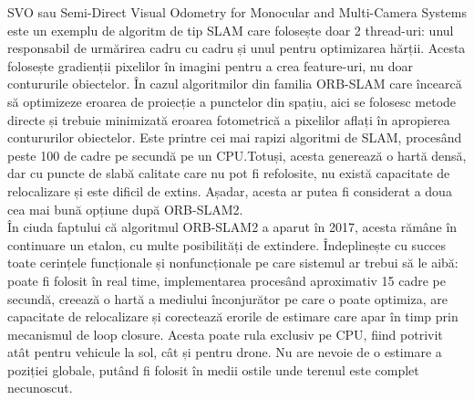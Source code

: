 \documentclass[12pt,a4paper]{report}
\begin{document}
SVO sau Semi-Direct Visual Odometry for Monocular and Multi-Camera Systems este un exemplu 
de algoritm de tip SLAM care folosește doar 2 thread-uri: unul responsabil de 
urmărirea cadru cu cadru și unul pentru optimizarea hărții. Acesta folosește gradienții
pixelilor în imagini pentru a crea feature-uri, nu doar contururile obiectelor. În cazul
algoritmilor din familia ORB-SLAM care încearcă să optimizeze eroarea de proiecție a punctelor
din spațiu, aici se folosesc metode directe și trebuie minimizată eroarea fotometrică a 
pixelilor aflați în apropierea contururilor obiectelor. Este printre cei mai rapizi algoritmi
de SLAM, procesând peste 100 de cadre pe secundă pe un CPU.\@ Totuși, acesta generează o hartă densă, dar cu 
puncte de slabă calitate care nu pot fi refolosite, nu există capacitate de relocalizare și 
este dificil de extins. Așadar, acesta ar putea fi considerat a doua cea mai bună opțiune după ORB-SLAM2.\\

În ciuda faptului că algoritmul ORB-SLAM2 a aparut în 2017, acesta rămâne în continuare 
un etalon, cu multe posibilități de extindere. Îndeplinește cu succes toate cerințele funcționale 
și nonfuncționale pe care sistemul ar trebui să le aibă: poate fi folosit în real time,
implementarea procesând aproximativ 15 cadre pe secundă, creează o hartă a mediului înconjurător
pe care o poate optimiza, are capacitate de relocalizare și corectează erorile de estimare
care apar în timp prin mecanismul de loop closure. Acesta poate rula exclusiv pe CPU, fiind
potrivit atât pentru vehicule la sol, cât și pentru drone. Nu are nevoie de o estimare a poziției
globale, putând fi folosit în medii ostile unde terenul este complet necunoscut.  

\end{document}
